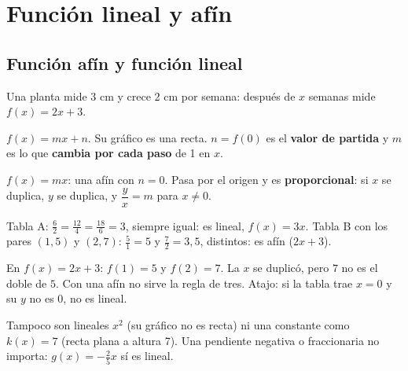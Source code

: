 \section{Función lineal y afín}

\subsection{Función afín y función lineal}
Una planta mide 3 cm y crece 2 cm por semana: después de $x$ semanas mide $f(x) = 2x + 3$.
\begin{clave} $f(x) = mx + n$. Su gráfico es una recta. $n = f(0)$ es el \textbf{valor de partida} y $m$ es lo que \textbf{cambia por cada paso} de 1 en $x$.\end{clave}
\begin{clave} $f(x) = mx$: una afín con $n = 0$. Pasa por el origen y es \textbf{proporcional}: si $x$ se duplica, $y$ se duplica, y $\dfrac{y}{x} = m$ para $x \neq 0$.\end{clave}
\begin{ejemplo} Tabla A: $\frac{6}{2} = \frac{12}{4} = \frac{18}{6} = 3$, siempre igual: es lineal, $f(x) = 3x$. Tabla B con los pares $(1, 5)$ y $(2, 7)$: $\frac{5}{1} = 5$ y $\frac{7}{2} = 3{,}5$, distintos: es afín ($2x + 3$).\end{ejemplo}
\begin{ojo} En $f(x) = 2x + 3$: $f(1) = 5$ y $f(2) = 7$. La $x$ se duplicó, pero $7$ no es el doble de $5$. Con una afín no sirve la regla de tres. Atajo: si la tabla trae $x = 0$ y su $y$ no es $0$, no es lineal.\end{ojo}
Tampoco son lineales $x^2$ (su gráfico no es recta) ni una constante como $k(x) = 7$ (recta plana a altura 7). Una pendiente negativa o fraccionaria no importa: $g(x) = -\frac{2}{5}x$ sí es lineal.

